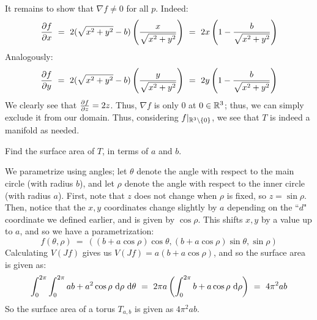 \begin{soln}
    It remains to show that $ \nabla f \neq 0 $ for all $ p $. Indeed:
    \begin{equation*}
        \frac{\partial f}{\partial x} \ = \
        2(\sqrt{x^{2}+y^{2}}-b)\left( \frac{x}{\sqrt{x^{2}+y^{2}}} \right) \ = \
        2x \left( 1-\frac{b}{\sqrt{x^{2}+y^{2}}} \right)
    \end{equation*}
    Analogously:
    \begin{equation*}
        \frac{\partial f}{\partial y} \ = \
        2(\sqrt{x^{2}+y^{2}}-b)\left( \frac{y}{\sqrt{x^{2}+y^{2}}} \right) \ = \
        2y \left( 1-\frac{b}{\sqrt{x^{2}+y^{2}}} \right)
    \end{equation*}
    We clearly see that $ \frac{\partial f}{\partial z} = 2z $. Thus, $ \nabla f $ is only 0
    at $ 0 \in \mathbb{R}^{3} $; thus, we can simply exclude it from our domain. Thus,
    considering $ f\rvert_{\mathbb{R}^{3}\setminus\left\{{0}\right\}} $, we see that $ T $ is
    indeed a manifold as needed.
\end{soln}

\begin{qu}[num=41.3]
    Find the surface area of $ T $, in terms of $ a $ and $ b $.
\end{qu}

\begin{soln}
    We parametrize using angles; let $ \theta $ denote the angle with respect to
    the main circle (with radius $ b $), and let $ \rho $ denote the angle with
    respect to the inner circle (with radius $ a $). First, note that $ z $ does
    not change when $ \rho $ is fixed, so $ z = \sin\rho $. \vsp
    Then, notice that the $ x, y $ coordinates change slightly by $ a $ depending
    on the ``$ d $" coordinate we defined earlier, and is given by $ \cos\rho $.
    This shifts $ x,y $ by a value up to $ a $, and so we have a parametrization:
    \begin{equation*}
        f(\theta,\rho) \ = \ ((b+a\cos\rho)\cos\theta, (b+a\cos\rho)\sin\theta,
        \sin\rho)
    \end{equation*}
    Calculating $ V(Jf) $ gives us $ V(Jf) = a(b+a\cos\rho) $, and so the surface
    area is given as:
    \begin{equation*}
        \int_{0}^{2\pi}\int_{0}^{2\pi}ab+a^{2}\cos\rho\textrm{ d}\rho\textrm{ d}\theta \ = \
        2\pi a \left( \int_{0}^{2\pi}b+a\cos\rho\textrm{ d}\rho \right) \ = \
        4\pi^{2}ab
    \end{equation*}
    So the surface area of a torus $ T_{a,b} $ is given as $ 4\pi^{2}ab $.
\end{soln}



